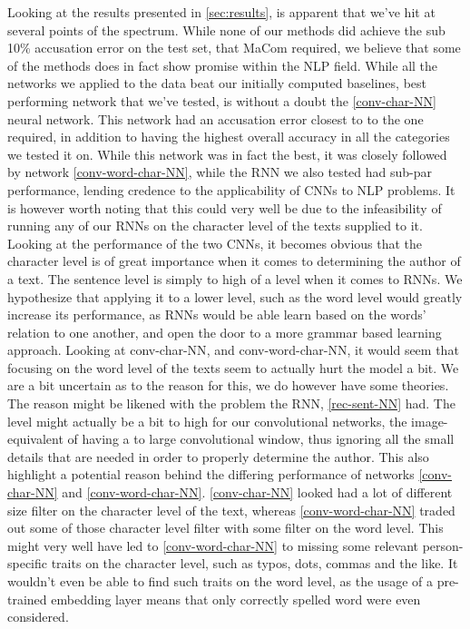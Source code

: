 Looking at the results presented in \ref{sec:results}, is apparent that we've
hit at several points of the spectrum. While none of our methods did achieve
the sub 10\% accusation error on the test set, that MaCom required, we believe
that some of the methods does in fact show promise within the \gls{NLP} field.
While all the networks we applied to the data beat our initially computed
baselines, best performing network that we've tested, is without a doubt the
\ref{conv-char-NN} neural network. This network had an accusation error closest
to to the one required, in addition to having the highest overall accuracy
in all the categories we tested it on. While this network was in fact the
best, it was closely followed by network \ref{conv-word-char-NN}, while the
\gls{RNN} we also tested had sub-par performance, lending credence to the
applicability of \gls{CNN}s to \gls{NLP} problems. It is however worth noting
that this could very well be due to the infeasibility of running any of our
\gls{RNN}s on the character level of the texts supplied to it. Looking at the
performance of the two \gls{CNN}s, it becomes obvious that the character level
is of great importance when it comes to determining the author of a text. The
sentence level is simply to high of a level when it comes to \gls{RNN}s. We
hypothesize that applying it to a lower level, such as the word level would
greatly increase its performance, as \gls{RNN}s would be able learn based on
the words' relation to one another, and open the door to a more grammar based
learning approach. Looking at \gls{conv-char-NN}, and \gls{conv-word-char-NN},
it would seem that focusing on the word level of the texts seem to actually
hurt the model a bit. We are a bit uncertain as to the reason for this, we do
however have some theories. The reason might be likened with the problem the
\gls{RNN}, \ref{rec-sent-NN} had. The level might actually be a bit to high
for our convolutional networks, the image-equivalent of having a to large
convolutional window, thus ignoring all the small details that are needed
in order to properly determine the author. This also highlight a potential
reason behind the differing performance of networks \ref{conv-char-NN} and
\ref{conv-word-char-NN}. \ref{conv-char-NN} looked had a lot of different size
filter on the character level of the text, whereas \ref{conv-word-char-NN}
traded out some of those character level filter with some filter on the word
level. This might very well have led to \ref{conv-word-char-NN} to missing some
relevant person-specific traits on the character level, such as typos, dots,
commas and the like. It wouldn't even be able to find such traits on the word
level, as the usage of a pre-trained embedding layer means that only correctly
spelled word were even considered.

